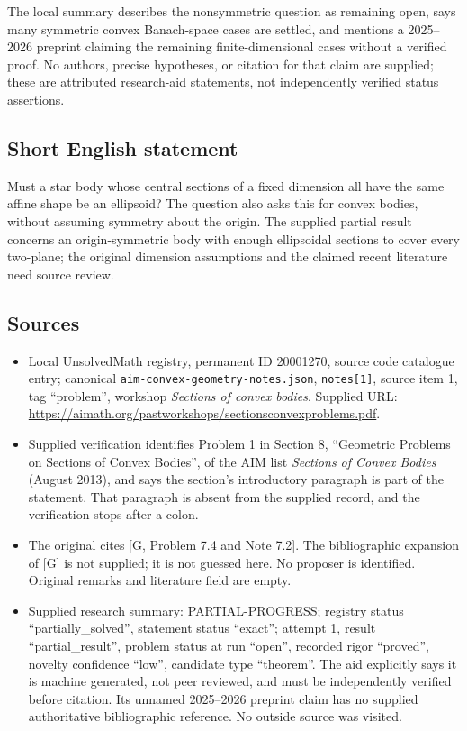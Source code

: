 \documentclass[11pt]{article}
\begin{document}
The local summary describes the nonsymmetric question as remaining open, says many symmetric convex Banach-space cases are settled, and mentions a 2025--2026 preprint claiming the remaining finite-dimensional cases without a verified proof. No authors, precise hypotheses, or citation for that claim are supplied; these are attributed research-aid statements, not independently verified status assertions.
\subsection{Short English statement}
Must a star body whose central sections of a fixed dimension all have the same affine shape be an ellipsoid? The question also asks this for convex bodies, without assuming symmetry about the origin. The supplied partial result concerns an origin-symmetric body with enough ellipsoidal sections to cover every two-plane; the original dimension assumptions and the claimed recent literature need source review.
\subsection{Sources}
\begin{itemize}
\item Local UnsolvedMath registry, permanent ID 20001270, source code catalogue entry; canonical \texttt{aim-convex-geometry-notes.json}, \texttt{notes[1]}, source item 1, tag ``problem'', workshop \emph{Sections of convex bodies}. Supplied URL: \url{https://aimath.org/pastworkshops/sectionsconvexproblems.pdf}.
\item Supplied verification identifies Problem 1 in Section 8, ``Geometric Problems on Sections of Convex Bodies'', of the AIM list \emph{Sections of Convex Bodies} (August 2013), and says the section's introductory paragraph is part of the statement. That paragraph is absent from the supplied record, and the verification stops after a colon.
\item The original cites [G, Problem 7.4 and Note 7.2]. The bibliographic expansion of [G] is not supplied; it is not guessed here. No proposer is identified. Original remarks and literature field are empty.
\item Supplied research summary: PARTIAL-PROGRESS; registry status ``partially\_solved'', statement status ``exact''; attempt 1, result ``partial\_result'', problem status at run ``open'', recorded rigor ``proved'', novelty confidence ``low'', candidate type ``theorem''. The aid explicitly says it is machine generated, not peer reviewed, and must be independently verified before citation. Its unnamed 2025--2026 preprint claim has no supplied authoritative bibliographic reference. No outside source was visited.
\end{itemize}
\end{document}
